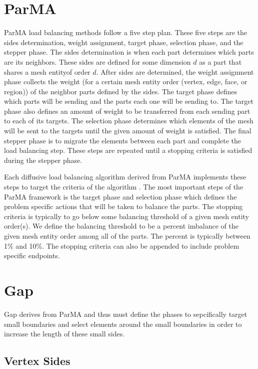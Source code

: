\documentclass{thesis}
\begin{document}
\section{ParMA}

ParMA load balancing methods follow a five step plan. These five steps 
are the sides determination, weight assignment, target phase, selection
phase, and the stepper phase. The sides determination is when each part 
determines which parts are its neighbors. These sides are defined for some
 dimension $d$ as a part that shares a mesh entityof order $d$. After sides are 
determined, the weight assignment phase collects the weight (for a certain 
mesh entity order (vertex, edge, face, or region)) of the neighbor parts 
defined by the sides. The 
target phase defines which parts will be sending and the parts each one 
will be sending to. The target phase also defines an amount of weight to 
be transferred from each sending part to each of its targets. The selection 
phase determines which elements of the mesh will be sent to the targets 
until the given amount of weight is satisfied. The final stepper phase is 
to migrate the elements between each part and complete the load balancing 
step. These steps are repeated until a stopping criteria is satisfied 
during the stepper phase. 

Each diffusive load balancing algorithm derived from ParMA implements these 
steps to target the criteria of the algorithm \cite{parma}. The most important 
steps of the ParMA framework is the target phase and selection phase which 
defines the problem specific actions that will be taken to balance the parts. 
The stopping criteria is typically to go below some balancing threshold of 
a given mesh entity order(s). We define the balancing threshold to be a 
percent imbalance of the given mesh entity order among all of the parts. 
The percent is typically between 1\% and 10\%. The stopping criteria can also 
be appended to include problem specific endpoints.
 
  
\section{Gap}

Gap derives from ParMA and thus must define the phases to sepcifically target 
small boundaries and select elements around the small boundaries in order 
to increase the length of these small sides. 

\subsection{Vertex Sides}
\end{document}
